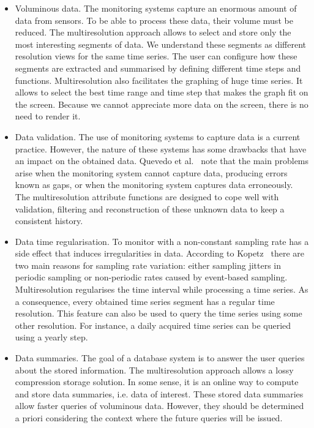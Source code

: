 \begin{itemize}

\item Voluminous data. The monitoring systems capture an enormous
  amount of data from sensors. To be able to process these data, their
  volume must be reduced. The multiresolution approach allows to
  select and store only the most interesting segments of data. We
  understand these segments as different resolution views for the same
  time series. The user can configure how these segments are extracted
  and summarised by defining different time steps and
  functions. Multiresolution also facilitates the graphing of huge
  time series. It allows to select the best time range and time step
  that makes the graph fit on the screen. Because we cannot appreciate
  more data on the screen, there is no need to render it.

\item Data validation. The use of monitoring systems to capture data
  is a current practice. However, the nature of these systems has some
  drawbacks that have an impact on the obtained data. Quevedo et
  al.~\cite{quevedo10} note that the main problems arise when the
  monitoring system cannot capture data, producing errors known as
  gaps, or when the monitoring system captures data erroneously.  The
  multiresolution attribute functions are designed to cope well with
  validation, filtering and reconstruction of these unknown data to
  keep a consistent history.

\item Data time regularisation. To monitor with a non-constant
  sampling rate has a side effect that induces irregularities in
  data. According to Kopetz~\cite{kopetz11:realtime} there are two
  main reasons for sampling rate variation: either sampling jitters in
  periodic sampling or non-periodic rates caused by event-based
  sampling.  Multiresolution regularises the time interval while
  processing a time series. As a consequence, every obtained time
  series segment has a regular time resolution. This feature can also
  be used to query the time series using some other resolution. For
  instance, a daily acquired time series can be queried using a yearly
  step.

\item Data summaries. The goal of a database system is to answer the
  user queries about the stored information. The multiresolution
  approach allows a lossy compression storage solution. In some sense,
  it is an online way to compute and store data summaries, i.e. data
  of interest. These stored data summaries allow faster queries of
  voluminous data. However, they should be determined a priori
  considering the context where the future queries will be issued.

\end{itemize}



